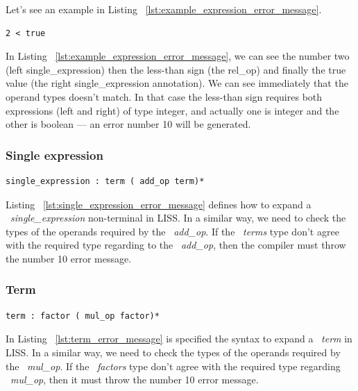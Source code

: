 \documentclass[
  oneside,
  11pt, a4paper,
  footinclude=true,
  headinclude=true,
  cleardoublepage=empty
]{scrbook}
\begin{document}
Let's see an example in Listing ~\ref{lst:example_expression_error_message}.

\begin{lstlisting}[caption={Example of an error message in expression rule},label={lst:example_expression_error_message}]
  2 < true
\end{lstlisting}

In Listing ~\ref{lst:example_expression_error_message}, we can see the number two (left single\_expression) then the less-than sign (the rel\_op) and finally the true value (the right single\_expression annotation).
We can see immediately that the operand types doesn't match.
In that case the less-than sign requires both expressions (left and right) of type integer, and actually one is integer and the other is boolean --- an error number 10 will be generated.

\subsubsection{Single expression}

\begin{lstlisting}[caption={Single\_expresion rule in LISS},label={lst:single_expression_error_message}]
  single_expression : term ( add_op term)*
\end{lstlisting}

Listing ~\ref{lst:single_expression_error_message} defines how to expand a ~\textit{single\_expression} non-terminal in LISS.
In a similar way, we need to check the types of the operands required by the ~\textit{add\_op}. If the ~\textit{terms} type don't agree with the required type regarding to the ~\textit{add\_op}, then the compiler must throw the number 10 error message.

\subsubsection{Term}

\begin{lstlisting}[caption={Term rule in LISS},label={lst:term_error_message}]
  term : factor ( mul_op factor)*
\end{lstlisting}

In Listing ~\ref{lst:term_error_message} is specified the syntax to expand a ~\textit{term} in LISS.
In a similar way, we need to check the types of the operands required by the ~\textit{mul\_op}. If the ~\textit{factors} type don't agree with the required type regarding ~\textit{mul\_op}, then it must throw the number 10 error message.
\end{document}
